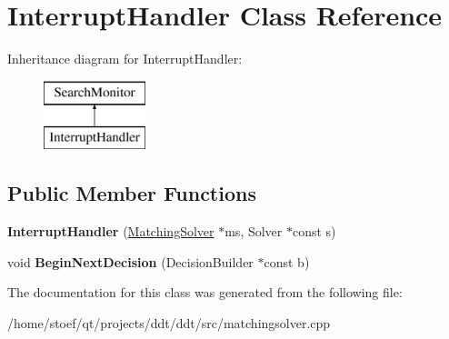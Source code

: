 \hypertarget{classInterruptHandler}{\section{Interrupt\-Handler Class Reference}
\label{classInterruptHandler}
}
Inheritance diagram for Interrupt\-Handler\-:\begin{figure}[H]
\begin{center}
\leavevmode
\includegraphics[height=2.000000cm]{classInterruptHandler}
\end{center}
\end{figure}
\subsection*{Public Member Functions}
\begin{DoxyCompactItemize}
\item 
\hypertarget{classInterruptHandler_a23d63a8baf03e339a76b0c81350e380d}{{\bfseries Interrupt\-Handler} (\hyperlink{classMatchingSolver}{Matching\-Solver} $\ast$ms, Solver $\ast$const s)}\label{classInterruptHandler_a23d63a8baf03e339a76b0c81350e380d}

\item 
\hypertarget{classInterruptHandler_a23f0af9de71fd7061d1fe3bc9ad55714}{void {\bfseries Begin\-Next\-Decision} (Decision\-Builder $\ast$const b)}\label{classInterruptHandler_a23f0af9de71fd7061d1fe3bc9ad55714}

\end{DoxyCompactItemize}


The documentation for this class was generated from the following file\-:\begin{DoxyCompactItemize}
\item 
/home/stoef/qt/projects/ddt/ddt/src/matchingsolver.\-cpp\end{DoxyCompactItemize}
